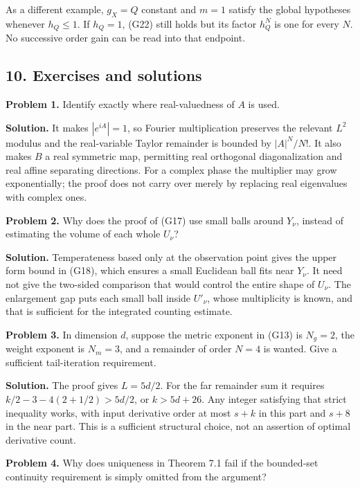 \documentclass[
  11pt,
]{article}
\begin{document}
As a different example, \(g_X=Q\) constant and \(m=1\) satisfy the
global hypotheses whenever \(h_Q\leq1\). If \(h_Q=1\), (G22) still holds
but its factor \(h_Q^N\) is one for every \(N\). No successive order
gain can be read into that endpoint.

\subsection{10. Exercises and solutions}\label{exercises-and-solutions}

\textbf{Problem 1.} Identify exactly where real-valuedness of \(A\) is
used.

\textbf{Solution.} It makes \(|e^{iA}|=1\), so Fourier multiplication
preserves the relevant \(L^2\) modulus and the real-variable Taylor
remainder is bounded by \(|A|^N/N!\). It also makes \(B\) a real
symmetric map, permitting real orthogonal diagonalization and real
affine separating directions. For a complex phase the multiplier may
grow exponentially; the proof does not carry over merely by replacing
real eigenvalues with complex ones.

\textbf{Problem 2.} Why does the proof of (G17) use small balls around
\(Y_\nu\), instead of estimating the volume of each whole \(U_\nu\)?

\textbf{Solution.} Temperateness based only at the observation point
gives the upper form bound in (G18), which ensures a small Euclidean
ball fits near \(Y_\nu\). It need not give the two-sided comparison that
would control the entire shape of \(U_\nu\). The enlargement gap puts
each small ball inside \(U'_\nu\), whose multiplicity is known, and that
is sufficient for the integrated counting estimate.

\textbf{Problem 3.} In dimension \(d\), suppose the metric exponent in
(G13) is \(N_g=2\), the weight exponent is \(N_m=3\), and a remainder of
order \(N=4\) is wanted. Give a sufficient tail-iteration requirement.

\textbf{Solution.} The proof gives \(L=5d/2\). For the far remainder sum
it requires \(k/2-3-4(2+1/2)>5d/2\), or \(k>5d+26\). Any integer
satisfying that strict inequality works, with input derivative order at
most \(s+k\) in this part and \(s+8\) in the near part. This is a
sufficient structural choice, not an assertion of optimal derivative
count.

\textbf{Problem 4.} Why does uniqueness in Theorem 7.1 fail if the
bounded-set continuity requirement is simply omitted from the argument?
\end{document}
